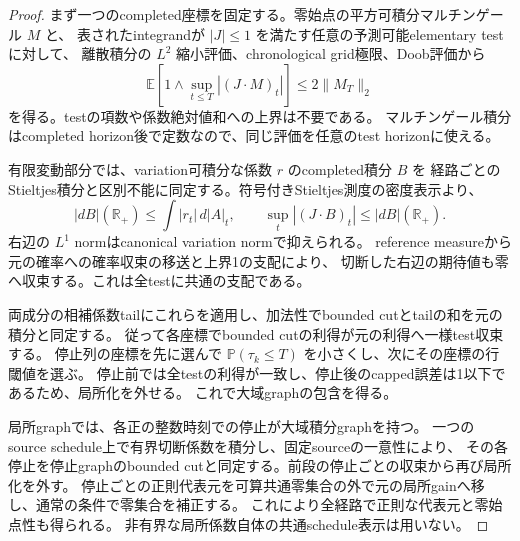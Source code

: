 \begin{proof}
まず一つのcompleted座標を固定する。零始点の平方可積分マルチンゲール $M$ と、
表されたintegrandが $|J|\le1$ を満たす任意の予測可能elementary testに対して、
離散積分の $L^2$ 縮小評価、chronological grid極限、Doob評価から
\[
 \mathbb E\!\left[1\wedge\sup_{t\le T}|(J\mathbin{\cdot}M)_t|\right]
 \le 2\|M_T\|_2
\]
を得る。testの項数や係数絶対値和への上界は不要である。
マルチンゲール積分はcompleted horizon後で定数なので、同じ評価を任意のtest horizonに使える。

有限変動部分では、variation可積分な係数 $r$ のcompleted積分 $B$ を
経路ごとのStieltjes積分と区別不能に同定する。符号付きStieltjes測度の密度表示より、
\[
 |dB|(\mathbb R_+)\le \int |r_t|\,d|A|_t,\qquad
 \sup_t |(J\mathbin{\cdot}B)_t|\le |dB|(\mathbb R_+).
\]
右辺の $L^1$ normはcanonical variation normで抑えられる。
reference measureから元の確率への確率収束の移送と上界1の支配により、
切断した右辺の期待値も零へ収束する。これは全testに共通の支配である。

両成分の相補係数tailにこれらを適用し、加法性でbounded cutとtailの和を元の積分と同定する。
従って各座標でbounded cutの利得が元の利得へ一様test収束する。
停止列の座標を先に選んで $\mathbb P(\tau_k\le T)$ を小さくし、次にその座標の行閾値を選ぶ。
停止前では全testの利得が一致し、停止後のcapped誤差は1以下であるため、局所化を外せる。
これで大域graphの包含を得る。

局所graphでは、各正の整数時刻での停止が大域積分graphを持つ。
一つのsource schedule上で有界切断係数を積分し、固定sourceの一意性により、
その各停止を停止graphのbounded cutと同定する。前段の停止ごとの収束から再び局所化を外す。
停止ごとの正則代表元を可算共通零集合の外で元の局所gainへ移し、通常の条件で零集合を補正する。
これにより全経路で正則な代表元と零始点性も得られる。
非有界な局所係数自体の共通schedule表示は用いない。
\end{proof}

